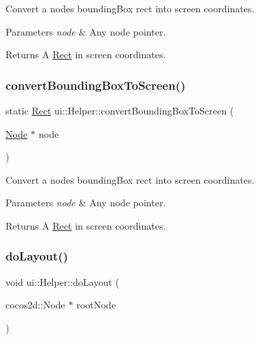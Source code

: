 Convert a node\textquotesingle{}s bounding\+Box rect into screen coordinates. 


\begin{DoxyParams}{Parameters}
{\em node} & Any node pointer.\\
\hline
\end{DoxyParams}
\begin{DoxyReturn}{Returns}
A \hyperlink{classRect}{Rect} in screen coordinates. 
\end{DoxyReturn}
\mbox{\label{classui_1_1Helper_acec5515b864cf02f7407591a38f6f6fd}} 
\subsubsection{\texorpdfstring{convert\+Bounding\+Box\+To\+Screen()}{convertBoundingBoxToScreen()}\hspace{0.1cm}{\footnotesize\ttfamily [2/2]}}
{\footnotesize\ttfamily static \hyperlink{classRect}{Rect} ui\+::\+Helper\+::convert\+Bounding\+Box\+To\+Screen (\begin{DoxyParamCaption}\item[{\hyperlink{classNode}{Node} $\ast$}]{node }\end{DoxyParamCaption})\hspace{0.3cm}{\ttfamily [static]}}



Convert a node\textquotesingle{}s bounding\+Box rect into screen coordinates. 


\begin{DoxyParams}{Parameters}
{\em node} & Any node pointer.\\
\hline
\end{DoxyParams}
\begin{DoxyReturn}{Returns}
A \hyperlink{classRect}{Rect} in screen coordinates. 
\end{DoxyReturn}
\mbox{\label{classui_1_1Helper_ac96dcd9a9bbf8d3ed8dc5d7377da5352}} 
\subsubsection{\texorpdfstring{do\+Layout()}{doLayout()}\hspace{0.1cm}{\footnotesize\ttfamily [1/2]}}
{\footnotesize\ttfamily void ui\+::\+Helper\+::do\+Layout (\begin{DoxyParamCaption}\item[{cocos2d\+::\+Node $\ast$}]{root\+Node }\end{DoxyParamCaption})\hspace{0.3cm}{\ttfamily [static]}}

